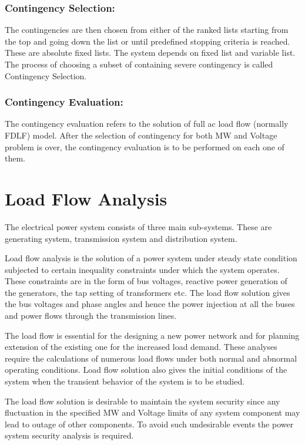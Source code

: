 \documentclass[a4paper,11pt]{article}
\begin{document}
\subsubsection{Contingency Selection:}

The contingencies are then chosen from either of the ranked lists starting from the top and going down the list or until predefined stopping criteria is reached. These are absolute fixed lists. The system depends on fixed list and variable list. The process of choosing a subset of containing severe contingency is called Contingency Selection.

\subsubsection{Contingency Evaluation:}
The contingency evaluation refers to the solution of full ac load flow (normally FDLF) model. After the selection of contingency for both MW and Voltage problem is over, the contingency evaluation is to be performed on each one of them.

\section{Load Flow Analysis}
The electrical power system consists of three main sub-systems. These are generating system, transmission system and distribution system.

Load flow analysis is the solution of a power system under steady state condition subjected to certain inequality constraints under which the system operates. These constraints are in the form of bus voltages, reactive power generation of the generators, the tap setting of transformers etc. The load flow solution gives the bus voltages and phase angles and hence the power injection at all the buses and power flows through the transmission lines.

The load flow is essential for the designing a new power network and for planning extension of the existing one for the increased load demand. These analyses require the calculations of numerous load flows under both normal and abnormal operating conditions. Load flow solution also gives the initial conditions of the system when the transient behavior of the system is to be studied.

The load flow solution is desirable to maintain the system security since any fluctuation in the specified MW and Voltage limits of any system component may lead to outage of other components. To avoid such undesirable events the power system security analysis is required.
\end{document}
